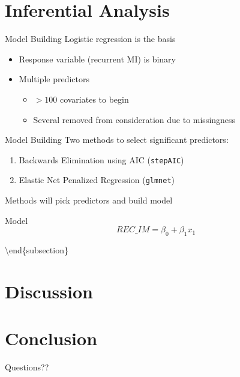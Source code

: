 \documentclass[
  ignorenonframetext,
]{beamer}
\begin{document}
\hypertarget{inferential-analysis}{%
\section{Inferential Analysis}\label{inferential-analysis}}

\begin{frame}{Model Building}
\protect\hypertarget{model-building}{}
Logistic regression is the basis

\begin{itemize}
\item
  Response variable (recurrent MI) is binary
\item
  Multiple predictors

  \begin{itemize}
  \item
    \(>100\) covariates to begin
  \item
    Several removed from consideration due to missingness
  \end{itemize}
\end{itemize}
\end{frame}

\begin{frame}[fragile]{Model Building}
\protect\hypertarget{model-building-1}{}
Two methods to select significant predictors:

\begin{enumerate}
\item
  Backwards Elimination using AIC (\texttt{stepAIC})
\item
  Elastic Net Penalized Regression (\texttt{glmnet})
\end{enumerate}

Methods will pick predictors and build model
\end{frame}

\begin{frame}{Model}
\protect\hypertarget{model}{}
\[ REC\_IM = \beta_0 + \beta_1 x_1 \]

\textbackslash end\{subsection\}
\end{frame}

\hypertarget{discussion}{%
\section{Discussion}\label{discussion}}

\hypertarget{conclusion}{%
\section{Conclusion}\label{conclusion}}

\begin{frame}{}
\protect\hypertarget{section}{}
\begin{block}{}
\begin{center}
\Large{Questions??}
\end{center}
\end{block}
\end{frame}
\end{document}
